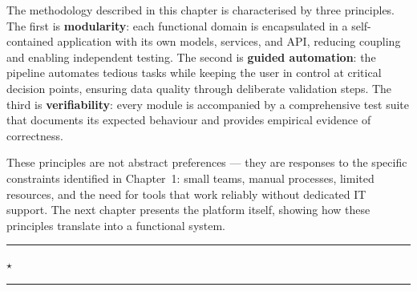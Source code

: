 \noindent
The methodology described in this chapter
is characterised by three principles.
The first is \textbf{modularity}: each functional domain
is encapsulated in a self-contained application
with its own models, services, and API,
reducing coupling and enabling independent testing.
The second is \textbf{guided automation}:
the pipeline automates tedious tasks
while keeping the user in control at critical
decision points, ensuring data quality
through deliberate validation steps.
The third is \textbf{verifiability}:
every module is accompanied by a comprehensive test suite
that documents its expected behaviour
and provides empirical evidence of correctness.

\vspace{0.4cm}
\noindent
These principles are not abstract preferences —
they are responses to the specific constraints
identified in Chapter~1: small teams, manual processes,
limited resources, and the need for tools
that work reliably without dedicated IT support.
The next chapter presents the platform itself,
showing how these principles translate
into a functional system.

\vspace{0.7cm}
\begin{center}
  \textcolor{BITred!40}{\rule{0.35\linewidth}{0.5pt}}
  \hspace{0.5em}
  \textcolor{BITred}{$\star$}
  \hspace{0.5em}
  \textcolor{BITred!40}{\rule{0.35\linewidth}{0.5pt}}
\end{center}
